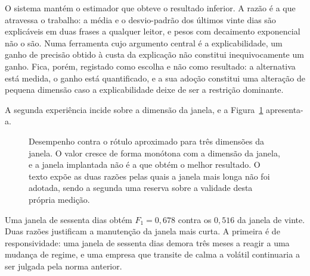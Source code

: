 O sistema mantém o estimador que obteve o resultado inferior. A razão é a que atravessa o trabalho:
a média e o desvio-padrão dos últimos vinte dias são explicáveis em duas frases a qualquer leitor, e
pesos com decaimento exponencial não o são. Numa ferramenta cujo argumento central é a
explicabilidade, um ganho de precisão obtido à custa da explicação não constitui inequivocamente um
ganho. Fica, porém, registado como escolha e não como resultado: a alternativa está medida, o ganho
está quantificado, e a sua adoção constitui uma alteração de pequena dimensão caso a explicabilidade
deixe de ser a restrição dominante.

A segunda experiência incide sobre a dimensão da janela, e a Figura~\ref{fig:av_janela} apresenta-a.

\begin{figure}[htbp]
\centering
{}
\caption[Ablação à dimensão da janela]{Desempenho contra o rótulo aproximado para três dimensões da
janela. O valor cresce de forma monótona com a dimensão da janela, e a janela implantada não é a que
obtém o melhor resultado. O texto expõe as duas razões pelas quais a janela mais longa não foi
adotada, sendo a segunda uma reserva sobre a validade desta própria medição.}
\label{fig:av_janela}
\end{figure}

Uma janela de sessenta dias obtém $F_1 = 0{,}678$ contra os $0{,}516$ da janela de vinte. Duas razões
justificam a manutenção da janela mais curta. A primeira é de responsividade: uma janela de sessenta
dias demora três meses a reagir a uma mudança de regime, e uma empresa que transite de calma a
volátil continuaria a ser julgada pela norma anterior.

